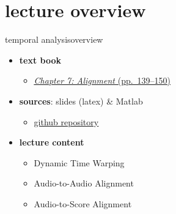 

\subtitle{Part 8.1: Alignment}


	

    \section[overview]{lecture overview}
        \begin{frame}{temporal analysis}{overview}
            \begin{itemize}
                \item   \textbf{text book}  
                    \begin{itemize}
                        \item   \href{http://ieeexplore.ieee.org/xpl/articleDetails.jsp?tp=&arnumber=6331124&}{\underline{\textit{Chapter 7: Alignment} (pp.~139--150)}}
                    \end{itemize}
                \item   \textbf{sources}: slides (latex) \& Matlab  
                    \begin{itemize}
                        \item   \href{https://github.com/alexanderlerch/ACA-Slides}{\underline{github repository}}
                    \end{itemize}
                \bigskip
                \item<2->   \textbf{lecture content}
                    \begin{itemize}
                        \item<2->   Dynamic Time Warping
                        \item<3->   Audio-to-Audio Alignment
                        \item<4->   Audio-to-Score Alignment
                    \end{itemize}
            \end{itemize}
        \end{frame}

